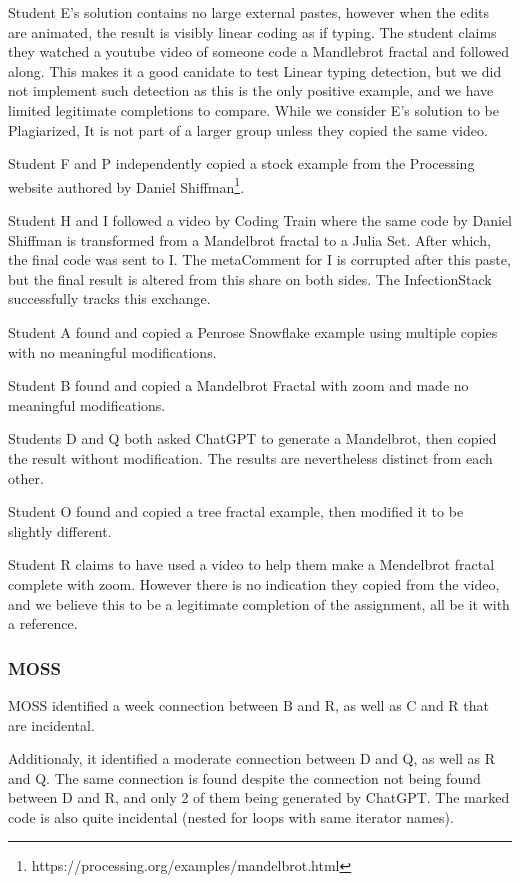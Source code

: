 \documentclass[letterpaper,10pt,conference]{IEEEtran}
\newcommand{\metaComment}{metaComment\xspace}
\newcommand{\infectionStack}{InfectionStack\xspace}
\begin{document}
Student E's solution contains no large external pastes, however when the edits are animated, the result is visibly linear coding as if typing.  The student claims they watched a youtube video of someone code a Mandlebrot fractal and followed along.  This makes it a good canidate to test Linear typing detection, but we did not implement such detection as this is the only positive example, and we have limited legitimate completions to compare.  While we consider E's solution to be Plagiarized, It is not part of a larger group unless they copied the same video.

Student F and P independently copied a stock example from the Processing website authored by Daniel Shiffman\footnote{https://processing.org/examples/mandelbrot.html}. 

Student H and I followed a video by Coding Train where the same code by Daniel Shiffman is transformed from a Mandelbrot fractal to a Julia Set.  After which, the final code was sent to I.  The \metaComment for I is corrupted after this paste, but the final result is altered from this share on both sides.  The \infectionStack successfully tracks this exchange.

Student A found and copied a Penrose Snowflake example using multiple copies with no meaningful modifications.

Student B found and copied a Mandelbrot Fractal with zoom and made no meaningful modifications.

Students D and Q both asked ChatGPT to generate a Mandelbrot, then copied the result without modification.  The results are nevertheless distinct from each other.

Student O found and copied a tree fractal example, then modified it to be slightly different.

Student R claims to have used a video to help them make a Mendelbrot fractal complete with zoom. However there is no indication they copied from the video, and we believe this to be a legitimate completion of the assignment, all be it with a reference.

\subsubsection{MOSS}

MOSS identified a week connection between B and R, as well as C and R that are incidental.  

Additionaly, it identified a moderate connection between D and Q, as well as R and Q.  The same connection is found despite the connection not being found between D and R, and only 2 of them being generated by ChatGPT.  The marked code is also quite incidental (nested for loops with same iterator names).
\end{document}
